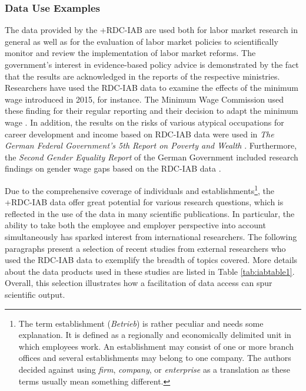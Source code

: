 \documentclass[
]{WileySix}
\begin{document}
\hypertarget{data-use-examples}{%
\subsubsection{Data Use Examples}\label{data-use-examples}}

The data provided by the +RDC-IAB\textbar{} are used both for labor market research in general as well as for the evaluation of labor market policies to scientifically monitor and review the implementation of labor market reforms. The government's interest in evidence-based policy advice is demonstrated by the fact that the results are acknowledged in the reports of the respective ministries. Researchers have used the RDC-IAB data to examine the effects of the minimum wage introduced in 2015, for instance. The Minimum Wage Commission used these finding for their regular reporting and their decision to adapt the minimum wage \citep{mindestlohnkommission2016, mindestlohnkommission2016a}. In addition, the results on the risks of various atypical occupations for career development and income based on RDC-IAB data were used in \emph{The German Federal Government's 5th Report on Poverty and Wealth} \citep{bmasbundesministeriumfurarbeitundsoziales2017, rwirheinisch-westfalischesinstitutfurwirtschaftsforschung2016}. Furthermore, the \emph{Second Gender Equality Report} of the German Government included research findings on gender wage gaps based on the RDC-IAB data \citep{bmfsfjbundesministeriumfurfamilieseniorenfrauenundjugend2017, boll2015}.

Due to the comprehensive coverage of individuals and establishments\footnote{The term establishment (\emph{Betrieb}) is rather peculiar and needs some explanation. It is defined as a regionally and economically delimited unit in which employees work. An establishment may consist of one or more branch offices and several establishments may belong to one company. The authors decided against using \emph{firm}, \emph{company}, or \emph{enterprise} as a translation as these terms usually mean something different.}, the +RDC-IAB\textbar{} data offer great potential for various research questions, which is reflected in the use of the data in many scientific publications. In particular, the ability to take both the employee and employer perspective into account simultaneously has sparked interest from international researchers. The following paragraphs present a selection of recent studies from external researchers who used the RDC-IAB data to exemplify the breadth of topics covered. More details about the data products used in these studies are listed in Table \ref{tab:iabtable1}. Overall, this selection illustrates how a facilitation of data access can spur scientific output.
\end{document}
